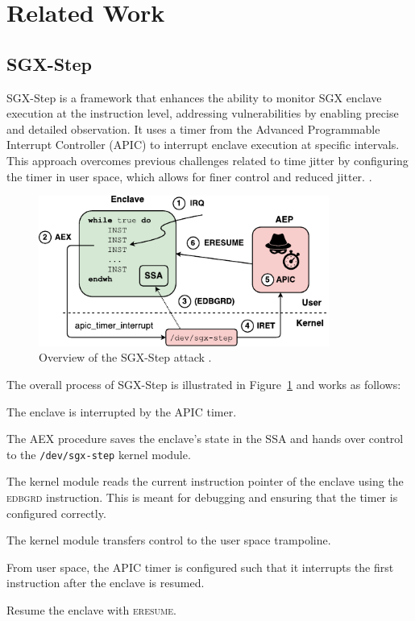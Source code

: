 \documentclass{llncs}
\begin{document}
\section{Related Work}

\subsection{SGX-Step}

SGX-Step \cite{BulckPS17} is a framework that enhances the ability to
monitor SGX enclave execution at the instruction level,
addressing vulnerabilities by enabling precise and detailed observation.
It uses a timer from the Advanced Programmable Interrupt Controller (APIC) to interrupt enclave execution at specific intervals. This approach overcomes previous challenges related to time jitter by configuring the timer in user space, which allows for finer control and reduced jitter. \cite{ArnautovTGKMPLM16}.

\begin{figure}[t!]
  \centering
  \includegraphics[width=0.85\textwidth]{images/sgx-step-overview.pdf}
  \caption{Overview of the SGX-Step attack \cite{BulckPS17}.}
  \label{fig:sgx-step}
\end{figure}

The overall process of SGX-Step is illustrated in Figure~\ref{fig:sgx-step} and works as follows:
\begin{enumerate*}
  \item[\ding{172}]
    The enclave is interrupted by the APIC timer.
  \item[\ding{173}]
    The AEX procedure saves the enclave's state in the SSA
    and hands over control to the \texttt{/dev/sgx-step} kernel module.
  \item[\ding{174}]
    The kernel module reads the current instruction pointer of the enclave using the \textsc{edbgrd} instruction.
    This is meant for debugging and ensuring that the timer is configured correctly.
  \item[\ding{175}]
    The kernel module transfers control to the user space trampoline.
  \item[\ding{176}]
    From user space, the APIC timer is configured
    such that it interrupts the first instruction after the enclave is resumed.
  \item[\ding{177}]
    Resume the enclave with \textsc{eresume}.
\end{enumerate*}
\end{document}
